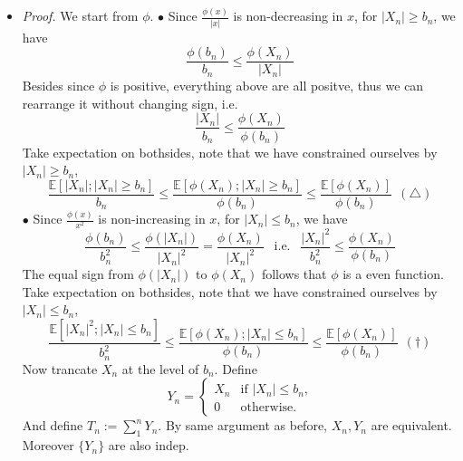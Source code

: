 \documentclass[a4paper,12pt,twoside]{book}
\begin{document}
\begin{itemize}
	\item[]\textit{Proof.} We start from $\phi$. \newline
	$\bullet$ Since $\frac{\phi(x)}{|x|}$ is non-decreasing in $x$, for $|X_n|\geq b_n$, we have
	\begin{equation}
		\frac{\phi(b_n)}{b_n}\leq \frac{\phi(X_n)}{|X_n|}
	\end{equation}
	Besides since $\phi$ is positive, everything above are all positve, thus we can rearrange it without changing sign, i.e.
	\begin{equation}
		\frac{|X_n|}{b_n}\leq \frac{\phi(X_n)}{\phi(b_n)}
	\end{equation}
	Take expectation on bothsides, note that we have constrained ourselves by $|X_n|\geq b_n$,
	\begin{equation}
		\frac{\mathbb{E}\left[|X_n|; |X_n|\geq b_n\right]}{b_n}\leq \frac{\mathbb{E}\left[\phi(X_n); |X_n|\geq b_n\right]}{\phi(b_n)} \leq \frac{\mathbb{E}\left[\phi(X_n)\right]}{\phi(b_n)}~~(\triangle)
	\end{equation}
	$\bullet$ Since $\frac{\phi(x)}{x^2}$ is non-increasing in $x$, for $|X_n|\leq b_n$, we have
	\begin{equation}
		\frac{\phi(b_n)}{b_n^2}\leq \frac{\phi(|X_n|)}{|X_n|^2}=\frac{\phi(X_n)}{|X_n|^2}~~\text{ i.e. }~~\frac{|X_n|^2}{b_n^2}\leq \frac{\phi(X_n)}{\phi(b_n)}
	\end{equation}
	The equal sign from $\phi(|X_n|)$ to $\phi(X_n)$ follows that $\phi$ is a even function. \newline
	Take expectation on bothsides, note that we have constrained ourselves by $|X_n|\leq b_n$,
	\begin{equation}
		\frac{\mathbb{E}\left[|X_n|^2; |X_n|\leq b_n\right]}{b_n^2}\leq \frac{\mathbb{E}\left[\phi(X_n); |X_n|\leq b_n\right]}{\phi(b_n)} \leq \frac{\mathbb{E}\left[\phi(X_n)\right]}{\phi(b_n)}~~(\dagger)
	\end{equation}
	Now trancate $X_n$ at the level of $b_n$. Define
	\begin{equation*}
		Y_{n} = \begin{cases}
		X_n &\text{if $|X_n|\leq b_n$,}\\
		0 &\text{otherwise.}
		\end{cases}
	\end{equation*}
	And define $T_n:=\sum_1^nY_n$. By same argument as before, $X_n, Y_n$ are equivalent. Moreover $\{Y_n\}$ are also indep. \newline

\end{itemize}
\end{document}
